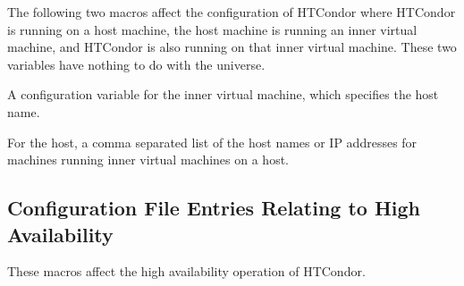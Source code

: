 The following two macros affect the configuration of HTCondor where HTCondor is
running on a host machine, the host machine is running an
inner virtual machine,
and HTCondor is also running on that inner virtual machine.
These two variables have nothing to do with the 
universe.

\begin{description}
\label{param:VMPHostMachine}
\item[\Macro{VMP\_HOST\_MACHINE}]
  A configuration variable for the inner virtual machine,
  which specifies the host name.

\label{param:VMPVMList}
\item[\Macro{VMP\_VM\_LIST}]
  For the host, 
  a comma separated list of the host names or IP addresses
  for machines running inner virtual machines on a host.
\end{description}

\subsection{\label{sec:HA-Config-File-Entries}Configuration File Entries
Relating to High Availability}

These macros affect the high availability operation of HTCondor.

